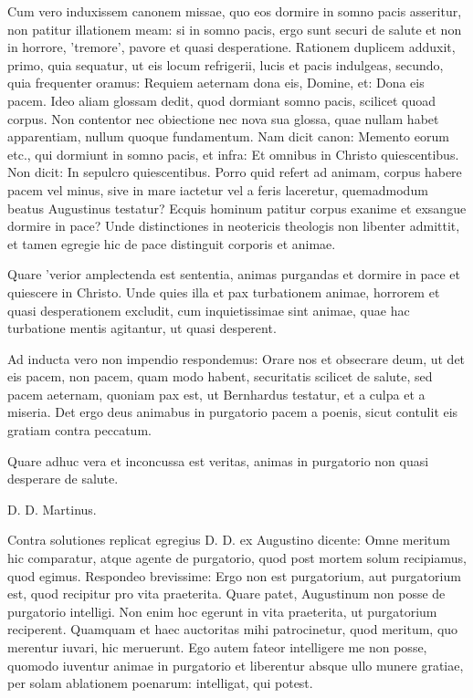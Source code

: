 Cum vero induxissem canonem missae, quo eos dormire in somno pacis asseritur, non patitur illationem meam: si in somno pacis, ergo sunt securi de salute et non in horrore, 'tremore', pavore et quasi desperatione. Rationem duplicem adduxit, primo, quia sequatur, ut eis locum refrigerii, lucis et pacis indulgeas, secundo, quia frequenter oramus: Requiem aeternam dona eis, Domine, et: Dona eis pacem. Ideo aliam glossam dedit, quod dormiant somno pacis, scilicet quoad corpus. Non contentor nec obiectione nec nova sua glossa, quae nullam habet apparentiam, nullum quoque fundamentum. Nam dicit canon: Memento eorum etc., qui dormiunt in somno pacis, et infra: Et omnibus in Christo quiescentibus. Non dicit: In sepulcro quiescentibus. Porro quid refert ad animam, corpus habere pacem vel minus, sive in mare iactetur vel a feris laceretur, quemadmodum beatus Augustinus testatur? Ecquis hominum patitur corpus exanime et exsangue dormire in pace? Unde distinctiones in neotericis theologis non libenter admittit, et tamen egregie hic de pace distinguit corporis et animae.

Quare 'verior amplectenda est sententia, animas purgandas et dormire in pace et quiescere in Christo. Unde quies illa et pax turbationem animae, horrorem et quasi desperationem excludit, cum inquietissimae sint animae, quae hac turbatione mentis agitantur, ut quasi desperent.

Ad inducta vero non impendio respondemus: Orare nos et obsecrare deum, ut det eis pacem, non pacem, quam modo habent, securitatis scilicet de salute, sed pacem aeternam, quoniam pax est, ut Bernhardus testatur, et a culpa et a miseria. Det ergo deus animabus in purgatorio pacem a poenis, sicut contulit eis gratiam contra peccatum.

Quare adhuc vera et inconcussa est veritas, animas in purgatorio non quasi desperare de salute.

D. D. Martinus.

Contra solutiones replicat egregius D. D. ex Augustino dicente: Omne meritum hic comparatur, atque agente de purgatorio, quod post mortem solum recipiamus, quod egimus. Respondeo brevissime: Ergo non est purgatorium, aut purgatorium est, quod recipitur pro vita praeterita. Quare patet, Augustinum non posse de purgatorio intelligi. Non enim hoc egerunt in vita praeterita, ut purgatorium reciperent. Quamquam et haec auctoritas mihi patrocinetur, quod meritum, quo merentur iuvari, hic meruerunt. Ego autem fateor intelligere me non posse, quomodo iuventur animae in purgatorio et liberentur absque ullo munere gratiae, per solam ablationem poenarum: intelligat, qui potest.

